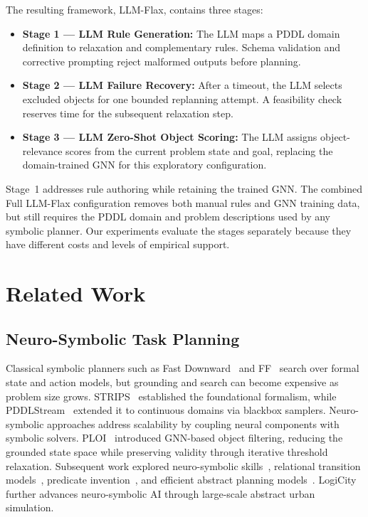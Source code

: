 \documentclass{ieeeaccess}
\newcommand{\method}{LLM-Flax\xspace}
\newcommand{\fullmethod}{Full LLM-Flax\xspace}
\begin{document}
The resulting framework, \method, contains three stages:
\begin{itemize}[noitemsep,topsep=2pt]
    \item \textbf{Stage 1 --- LLM Rule Generation:} The LLM maps a PDDL domain definition to relaxation and complementary rules. Schema validation and corrective prompting reject malformed outputs before planning.
    \item \textbf{Stage 2 --- LLM Failure Recovery:} After a timeout, the LLM selects excluded objects for one bounded replanning attempt. A feasibility check reserves time for the subsequent relaxation step.
    \item \textbf{Stage 3 --- LLM Zero-Shot Object Scoring:} The LLM assigns object-relevance scores from the current problem state and goal, replacing the domain-trained GNN for this exploratory configuration.
\end{itemize}
Stage~1 addresses rule authoring while retaining the trained GNN. The combined \fullmethod configuration removes both manual rules and GNN training data, but still requires the PDDL domain and problem descriptions used by any symbolic planner.
Our experiments evaluate the stages separately because they have different costs and levels of empirical support.


\section{Related Work}
\label{sec:related}

\subsection{Neuro-Symbolic Task Planning}
Classical symbolic planners such as Fast Downward~\cite{helmert2006fast} and FF~\cite{hoffmann2001ff} search over formal state and action models, but grounding and search can become expensive as problem size grows.
STRIPS~\cite{fikes1971strips} established the foundational formalism, while PDDLStream~\cite{garrett2020pddlstream} extended it to continuous domains via blackbox samplers.
Neuro-symbolic approaches address scalability by coupling neural components with symbolic solvers.
PLOI~\cite{silver2021planning} introduced GNN-based object filtering, reducing the grounded state space while preserving validity through iterative threshold relaxation.
Subsequent work explored neuro-symbolic skills~\cite{silver2022neurosymbolic}, relational transition models~\cite{chitnis2022learning}, predicate invention~\cite{silver2023predicate}, and efficient abstract planning models~\cite{kumar2023learning}.
LogiCity~\cite{li2024logicity} further advances neuro-symbolic AI through large-scale abstract urban simulation.
\end{document}
